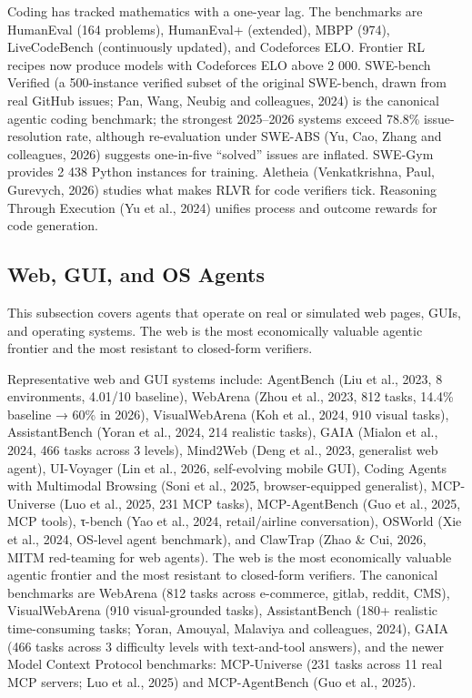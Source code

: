 Coding has tracked mathematics with a one-year lag. The benchmarks are HumanEval (164 problems), HumanEval+ (extended), MBPP (974), LiveCodeBench (continuously updated), and Codeforces ELO. Frontier RL recipes now produce models with Codeforces ELO above 2 000. SWE-bench Verified (a 500-instance verified subset of the original SWE-bench, drawn from real GitHub issues; Pan, Wang, Neubig and colleagues, 2024) is the canonical agentic coding benchmark; the strongest 2025--2026 systems exceed 78.8\% issue-resolution rate, although re-evaluation under SWE-ABS (Yu, Cao, Zhang and colleagues, 2026) suggests one-in-five ``solved'' issues are inflated. SWE-Gym provides 2 438 Python instances for training. Aletheia (Venkatkrishna, Paul, Gurevych, 2026) studies what makes RLVR for code verifiers tick. Reasoning Through Execution (Yu et al., 2024) unifies process and outcome rewards for code generation.

\subsection{Web, GUI, and OS Agents}\label{web-gui-and-os-agents}

This subsection covers agents that operate on real or simulated web pages, GUIs, and operating systems. The web is the most economically valuable agentic frontier and the most resistant to closed-form verifiers.

Representative web and GUI systems include: AgentBench (Liu et al., 2023, 8 environments, 4.01/10 baseline), WebArena (Zhou et al., 2023, 812 tasks, 14.4\% baseline → 60\% in 2026), VisualWebArena (Koh et al., 2024, 910 visual tasks), AssistantBench (Yoran et al., 2024, 214 realistic tasks), GAIA (Mialon et al., 2024, 466 tasks across 3 levels), Mind2Web (Deng et al., 2023, generalist web agent), UI-Voyager (Lin et al., 2026, self-evolving mobile GUI), Coding Agents with Multimodal Browsing (Soni et al., 2025, browser-equipped generalist), MCP-Universe (Luo et al., 2025, 231 MCP tasks), MCP-AgentBench (Guo et al., 2025, MCP tools), τ-bench (Yao et al., 2024, retail/airline conversation), OSWorld (Xie et al., 2024, OS-level agent benchmark), and ClawTrap (Zhao \& Cui, 2026, MITM red-teaming for web agents). The web is the most economically valuable agentic frontier and the most resistant to closed-form verifiers. The canonical benchmarks are WebArena (812 tasks across e-commerce, gitlab, reddit, CMS), VisualWebArena (910 visual-grounded tasks), AssistantBench (180+ realistic time-consuming tasks; Yoran, Amouyal, Malaviya and colleagues, 2024), GAIA (466 tasks across 3 difficulty levels with text-and-tool answers), and the newer Model Context Protocol benchmarks: MCP-Universe (231 tasks across 11 real MCP servers; Luo et al., 2025) and MCP-AgentBench (Guo et al., 2025).

